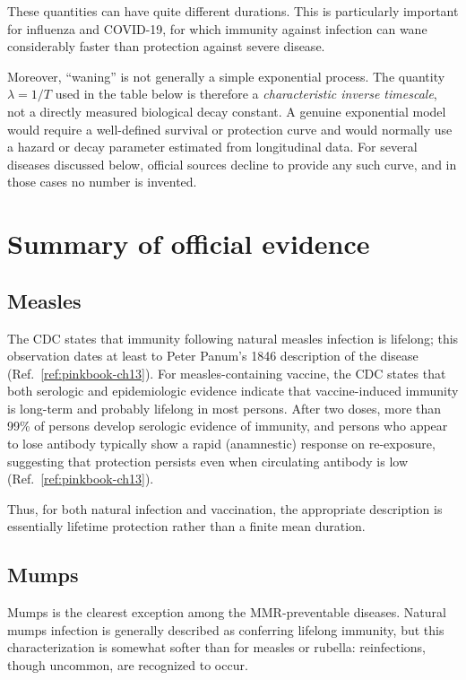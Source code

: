 \documentclass[11pt]{article}
\begin{document}
These quantities can have quite different durations. This is particularly
important for influenza and COVID-19, for which immunity against infection
can wane considerably faster than protection against severe disease.

Moreover, ``waning'' is not generally a simple exponential process. The
quantity $\lambda = 1/T$ used in the table below is therefore a
\emph{characteristic inverse timescale}, not a directly measured biological
decay constant. A genuine exponential model would require a well-defined
survival or protection curve and would normally use a hazard or decay
parameter estimated from longitudinal data. For several diseases discussed
below, official sources decline to provide any such curve, and in those
cases no number is invented.

\section{Summary of official evidence}

\subsection{Measles}

The CDC states that immunity following natural measles infection is
lifelong; this observation dates at least to Peter Panum's 1846 description
of the disease (Ref.~\ref{ref:pinkbook-ch13}). For measles-containing
vaccine, the CDC states that both serologic and epidemiologic evidence
indicate that vaccine-induced immunity is long-term and probably lifelong in
most persons. After two doses, more than 99\% of persons develop serologic
evidence of immunity, and persons who appear to lose antibody typically show
a rapid (anamnestic) response on re-exposure, suggesting that protection
persists even when circulating antibody is low (Ref.~\ref{ref:pinkbook-ch13}).

Thus, for both natural infection and vaccination, the appropriate
description is essentially lifetime protection rather than a finite mean
duration.

\subsection{Mumps}

Mumps is the clearest exception among the MMR-preventable diseases. Natural
mumps infection is generally described as conferring lifelong immunity, but
this characterization is somewhat softer than for measles or rubella:
reinfections, though uncommon, are recognized to occur.
\end{document}
